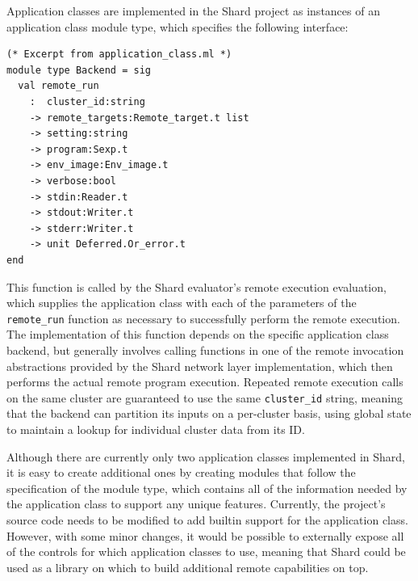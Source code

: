 \documentclass[oneside]{report}
\begin{document}

Application classes are implemented in the Shard project as instances of an application class module type, which specifies the following interface:

\begin{minipage}[c]{\textwidth-15pt}
  \begin{lstlisting}
(* Excerpt from application_class.ml *)
module type Backend = sig
  val remote_run
    :  cluster_id:string
    -> remote_targets:Remote_target.t list
    -> setting:string
    -> program:Sexp.t
    -> env_image:Env_image.t
    -> verbose:bool
    -> stdin:Reader.t
    -> stdout:Writer.t
    -> stderr:Writer.t
    -> unit Deferred.Or_error.t
end
\end{lstlisting}
  \smallskip
\end{minipage}

This function is called by the Shard evaluator's remote execution evaluation, which supplies the application class with each of the parameters of the \texttt{remote\_run} function as necessary to successfully perform the remote execution.
The implementation of this function depends on the specific application class backend, but generally involves calling functions in one of the remote invocation abstractions provided by the Shard network layer implementation, which then performs the actual remote program execution.
Repeated remote execution calls on the same cluster are guaranteed to use the same \texttt{cluster\_id} string, meaning that the backend can partition its inputs on a per-cluster basis, using global state to maintain a lookup for individual cluster data from its ID.

Although there are currently only two application classes implemented in Shard, it is easy to create additional ones by creating modules that follow the specification of the module type, which contains all of the information needed by the application class to support any unique features.
Currently, the project's source code needs to be modified to add builtin support for the application class. However, with some minor changes, it would be possible to externally expose all of the controls for which application classes to use, meaning that Shard could be used as a library on which to build additional remote capabilities on top.
\end{document}
